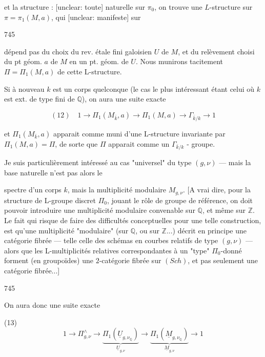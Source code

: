 et la structure : [unclear: toute] naturelle
sur $\pi_0$, on trouve une $L$-structure
sur $\pi = \pi_1(M, a)$, qui [unclear: manifeste] sur

\newpage


745

dépend pas du choix du rev. étale fini galoisien $U$ de $M$, et du relèvement choisi du pt géom. $a$ de $M$ en un pt. géom. de $U$. Nous munirons tacitement $\Pi = \Pi_1(M, a)$ de cette L-structure.

Si à nouveau $k$ est un corps quelconque (le cas le plus intéressant étant celui où $k$ est ext. de type fini de $\mathbb{Q}$), on aura une suite exacte

$$ (12) \quad 1 \longrightarrow \Pi_1(M_{\bar{k}}, a) \longrightarrow \Pi_1(M, a) \longrightarrow \Gamma_{\bar{k}/k} \longrightarrow 1 $$

et $\Pi_1(M_{\bar{k}}, a)$ apparait comme muni d'une L-structure invariante par $\Pi_1(M, a) = \Pi$, de sorte que $\Pi$ apparait comme un $\Gamma_{\bar{k}/k}$ - groupe.

Je suis particulièrement intéressé au cas "universel" du type $(g,\nu)$ — mais la base naturelle n'est pas alors le

\newpage


spectre d'un corps $k$, mais la multiplicité modulaire $M_{g,\nu}$. [A vrai dire, pour la structure de L-groupe discret $\Pi_0$, jouant le rôle de groupe de référence, on doit pouvoir introduire une multiplicité modulaire convenable sur $\mathbb{Q}$, et même sur $\mathbb{Z}$. Le fait qui risque de faire des difficultés conceptuelles pour une telle construction, est qu'une multiplicité "modulaire" (sur $\mathbb{Q}$, ou sur $\mathbb{Z}$...) décrit en principe une catégorie fibrée — telle celle des schémas en courbes relatifs de type $(g,\nu)$ — alors que les L-multiplicités relatives correspondantes à un "type" $\Pi_0$-donné forment (en groupoïdes) une $2$-catégorie fibrée sur $(Sch)$, et pas seulement une catégorie fibrée...]

\newpage


745

On aura donc une suite exacte

(13) $$1 \longrightarrow \Pi_{g,\nu}^\wedge \longrightarrow \underbrace{\Pi_1(\underline{U}_{g,\nu_\mathbb{Q}})}_{\underline{U}_{g,\nu}} \longrightarrow \underbrace{\Pi_1(\underline{M}_{g,\nu_\mathbb{Q}})}_{\underline{M}_{g,\nu}} \longrightarrow 1$$

